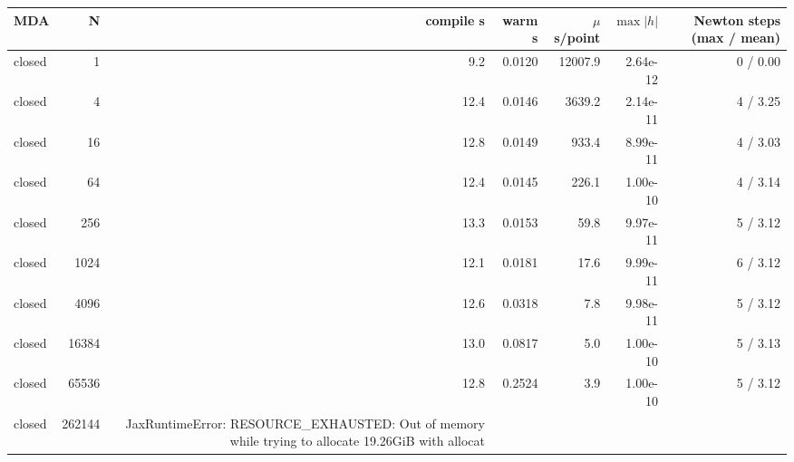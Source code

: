 \begin{tabular}{lrrrrrr}
\toprule
MDA & N & compile s & warm s & $\mu$s/point & $\max|h|$ & Newton steps (max / mean) \\
\midrule
closed & 1 & 9.2 & 0.0120 & 12007.9 & 2.64e-12 & 0 / 0.00 \\
closed & 4 & 12.4 & 0.0146 & 3639.2 & 2.14e-11 & 4 / 3.25 \\
closed & 16 & 12.8 & 0.0149 & 933.4 & 8.99e-11 & 4 / 3.03 \\
closed & 64 & 12.4 & 0.0145 & 226.1 & 1.00e-10 & 4 / 3.14 \\
closed & 256 & 13.3 & 0.0153 & 59.8 & 9.97e-11 & 5 / 3.12 \\
closed & 1024 & 12.1 & 0.0181 & 17.6 & 9.99e-11 & 6 / 3.12 \\
closed & 4096 & 12.6 & 0.0318 & 7.8 & 9.98e-11 & 5 / 3.12 \\
closed & 16384 & 13.0 & 0.0817 & 5.0 & 1.00e-10 & 5 / 3.13 \\
closed & 65536 & 12.8 & 0.2524 & 3.9 & 1.00e-10 & 5 / 3.12 \\
closed & 262144 & JaxRuntimeError: RESOURCE_EXHAUSTED: Out of memory while trying to allocate 19.26GiB with allocat &  &  &  &  \\
\bottomrule
\end{tabular}
